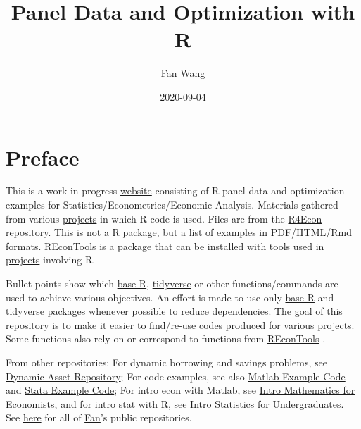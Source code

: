 \documentclass[
]{book}
\title{Panel Data and Optimization with R}
\author{Fan Wang}
\date{2020-09-04}
\begin{document}
\maketitle

{
\hypersetup{linkcolor=}
\setcounter{tocdepth}{1}
\tableofcontents
}
\hypertarget{preface}{%
\chapter*{Preface}\label{preface}}

This is a work-in-progress \href{https://fanwangecon.github.io/R4Econ/}{website} consisting of R panel data and optimization examples for Statistics/Econometrics/Economic Analysis. Materials gathered from various \href{https://fanwangecon.github.io/research}{projects} in which R code is used. Files are from the \href{https://github.com/FanWangEcon/R4Econ}{R4Econ} repository. This is not a R package, but a list of examples in PDF/HTML/Rmd formats. \href{https://fanwangecon.github.io/REconTools/}{REconTools} is a package that can be installed with tools used in \href{https://fanwangecon.github.io/research}{projects} involving R.

Bullet points show which \href{https://www.rdocumentation.org/packages/base/versions/3.5.2}{base R}, \href{https://www.tidyverse.org/}{tidyverse} or other functions/commands are used to achieve various objectives. An effort is made to use only \href{https://www.rdocumentation.org/packages/base/versions/3.5.2}{base R} \citep{R-base} and \href{https://www.tidyverse.org/}{tidyverse} \citep{R-tidyverse} packages whenever possible to reduce dependencies. The goal of this repository is to make it easier to find/re-use codes produced for various projects. Some functions also rely on or correspond to functions from \href{https://fanwangecon.github.io/REconTools/}{REconTools} \citep{R-REconTools}.

From other repositories: For dynamic borrowing and savings problems, see \href{https://fanwangecon.github.io/CodeDynaAsset/}{Dynamic Asset Repository}; For code examples, see also \href{https://fanwangecon.github.io/M4Econ/}{Matlab Example Code} and \href{https://fanwangecon.github.io/Stata4Econ/}{Stata Example Code}; For intro econ with Matlab, see \href{https://fanwangecon.github.io/Math4Econ/}{Intro Mathematics for Economists}, and for intro stat with R, see \href{https://fanwangecon.github.io/Stat4Econ/}{Intro Statistics for Undergraduates}. See \href{https://github.com/FanWangEcon}{here} for all of \href{https://fanwangecon.github.io/}{Fan}'s public repositories.
\end{document}
